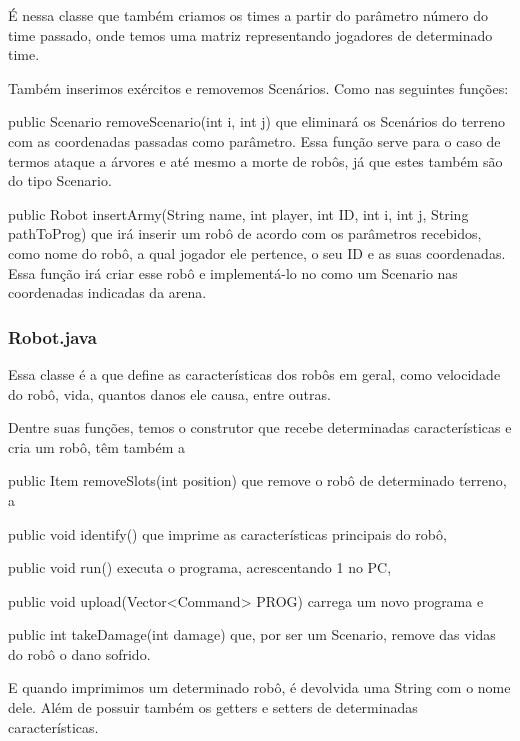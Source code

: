 \documentclass[a4paper]{article}
\begin{document}
{{{{{{{{{{{{{{{{{		    É nessa classe que também criamos os times a partir
		    do parâmetro número do time passado, onde temos uma 
		    matriz representando jogadores de determinado time.
		    
		    Também inserimos exércitos e removemos Scenários.
		    Como nas seguintes funções:
		    
		    {\textcolor{NavyBlue}{public Scenario
		    removeScenario(int i, int j)}
		    que eliminará os Scenários do terreno com as coordenadas
		    passadas como parâmetro. Essa função serve para o caso 
		    de termos ataque a árvores e até mesmo a morte de robôs,
		    já que estes também são do tipo Scenario.
		    
		    {\textcolor{NavyBlue}{public Robot insertArmy(String
		    name, int player, int ID, int i, int j, String pathToProg)}
            que irá inserir um robô de acordo com os parâmetros
            recebidos, como nome do robô, a qual jogador ele pertence,
            o seu ID e as suas coordenadas.
            Essa função irá criar esse robô e implementá-lo no como 
            um Scenario nas coordenadas indicadas da arena.
		    
		\subsubsection{ Robot.java }
			Essa classe é a que define as características dos robôs
			em geral, como velocidade do robô, vida, quantos danos ele
			causa, entre outras.
			
			Dentre suas funções, temos o construtor que recebe determinadas
			características e cria um robô, têm também a
			 
			{\textcolor{NavyBlue}{public Item removeSlots(int position)}
			que remove o robô de determinado terreno, a
			
			{\textcolor{NavyBlue}{public void identify()}
			que imprime as características principais do robô,
			
			{\textcolor{NavyBlue}{public void run()}
			executa o programa, acrescentando 1 no PC,
			
			{\textcolor{NavyBlue}{public void upload(Vector<Command> PROG)}
			carrega um novo programa e 
			
			{\textcolor{NavyBlue}{public int takeDamage(int damage)}
			que, por ser um Scenario, remove das vidas do robô o dano 
			sofrido.
			
			E quando imprimimos um determinado robô, é devolvida uma
			String com o nome dele. Além de possuir também os getters
			e setters de determinadas características.
			
}}}}}}}}}}}}}}}}}}}}}}}}
\end{document}
